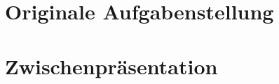 \section{Originale Aufgabenstellung}\label{originaleaufgabenstellung}

\section{Zwischenpräsentation}\label{zwischenpraesentation}

\label{srv_v1}
